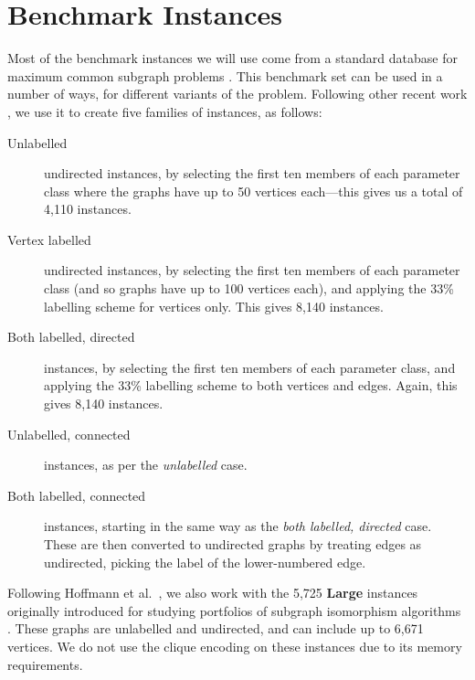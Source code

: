 \documentclass{llncs}
\begin{document}
\section{Benchmark Instances}

Most of the benchmark instances we will use come from a standard database for maximum common
subgraph problems \cite{DBLP:journals/prl/SantoFSV03,DBLP:journals/jgaa/ConteFV07}. This benchmark
set can be used in a number of ways, for different variants of the problem. Following other recent
work \cite{DBLP:conf/cp/McCreeshNPS16,DBLP:conf/aaai/HoffmannMR17,o:McCreeshPT17}, we use it to
create five families of instances, as follows:

\begin{description}
    \item[Unlabelled] undirected instances, by selecting the first ten members of each parameter
        class where the graphs have up to 50 vertices each---this gives us a total of 4,110
        instances.

    \item[Vertex labelled] undirected instances, by selecting the first ten members of each
        parameter class (and so graphs have up to 100 vertices each), and applying the 33\%
        labelling scheme for vertices only. This gives 8,140 instances.

    \item[Both labelled, directed] instances, by selecting the first ten members of each parameter
        class, and applying the 33\% labelling scheme to both vertices and edges. Again, this gives
        8,140 instances.

    \item[Unlabelled, connected] instances, as per the \emph{unlabelled} case.

    \item[Both labelled, connected] instances, starting in the same way as the \emph{both labelled,
        directed} case. These are then converted to undirected graphs by treating edges as
        undirected, picking the label of the lower-numbered edge.
\end{description}

\noindent
Following Hoffmann et al.\ \cite{DBLP:conf/aaai/HoffmannMR17}, we also work with the 5,725 \textbf{Large} instances
originally introduced for studying portfolios of subgraph isomorphism algorithms
\cite{DBLP:conf/lion/KotthoffMS16}. These graphs are unlabelled and undirected, and can include up
to 6,671 vertices. We do not use the clique encoding on these instances due to its
memory requirements.
\end{document}
